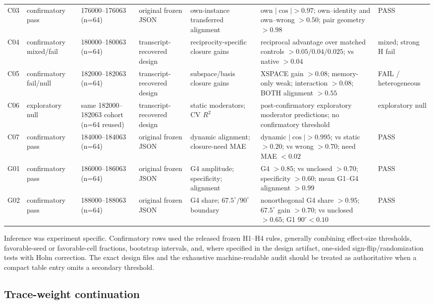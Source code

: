 \documentclass[11pt]{article}
\begin{document}
\begin{landscape}
\begin{longtable}{p{0.65cm}p{2.25cm}p{2.55cm}p{3.15cm}p{3.9cm}p{6.1cm}p{2.2cm}}
C03 & confirmatory pass & 176000--176063 (n=64) & original frozen JSON & own-instance transferred alignment & own $|\cos|>0.97$; own--identity and own--wrong $>0.50$; pair geometry $>0.98$ & PASS \\
C04 & confirmatory mixed/fail & 180000--180063 (n=64) & transcript-recovered design & reciprocity-specific closure gains & reciprocal advantage over matched controls $>0.05/0.04/0.025$; vs native $>0.04$ & mixed; strong H fail \\
C05 & confirmatory fail/null & 182000--182063 (n=64) & transcript-recovered design & subspace/basis closure gains & XSPACE gain $>0.08$; memory-only weak; interaction $>0.08$; BOTH alignment $>0.55$ & FAIL / heterogeneous \\
C06 & exploratory null & same 182000--182063 cohort (n=64 reused) & transcript-recovered design & static moderators; CV $R^2$ & post-confirmatory exploratory moderator predictions; no confirmatory threshold & exploratory null \\
C07 & confirmatory pass & 184000--184063 (n=64) & original frozen JSON & dynamic alignment; closure-need MAE & dynamic $|\cos|>0.995$; vs static $>0.20$; vs wrong $>0.70$; need MAE $<0.02$ & PASS \\
G01 & confirmatory pass & 186000--186063 (n=64) & original frozen JSON & G4 amplitude; specificity; alignment & G4 $>0.85$; vs unclosed $>0.70$; specificity $>0.60$; mean G1--G4 alignment $>0.99$ & PASS \\
G02 & confirmatory pass & 188000--188063 (n=64) & original frozen JSON & G4 share; $67.5^\circ/90^\circ$ boundary & nonorthogonal G4 share $>0.95$; $67.5^\circ$ gain $>0.70$; vs unclosed $>0.65$; G1 $90^\circ<0.10$ & PASS \\
\bottomrule
\end{longtable}
\end{landscape}

Inference was experiment specific. Confirmatory rows used the released frozen H1--H4 rules, generally combining effect-size thresholds, favorable-seed or favorable-cell fractions, bootstrap intervals, and, where specified in the design artifact, one-sided sign-flip/randomization tests with Holm correction. The exact design files and the exhaustive machine-readable audit should be treated as authoritative when a compact table entry omits a secondary threshold.

\subsection{Trace-weight continuation}
\end{document}
